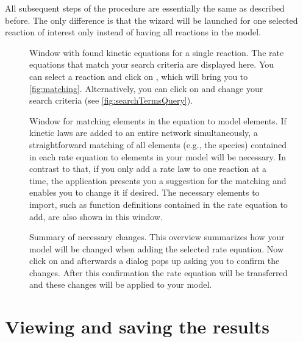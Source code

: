 All subsequent steps of the procedure are essentially the same as described before.
The only difference is that the \SABIO wizard will be launched for one selected reaction of interest only instead of having all reactions in the model.
\begin{figure}[t!]
\caption[Window with found kinetic equations for a single reaction]{Window with found kinetic equations for a single reaction.
The rate equations that match your search criteria are displayed here.
You can select a reaction and click on , which will bring you to \vref{fig:matching}.
Alternatively, you can click on  and change your search criteria (see \vref{fig:searchTermsQuery}).
\label{fig:foundEquationsManual}}
\end{figure}
\begin{figure}
\caption[Window for matching elements in the equation to model elements]{Window for matching elements in the equation to model elements.
If kinetic laws are added to an entire network simultaneously, a straightforward matching of all elements (e.g., the species) contained in each rate equation to \SBML elements in your model will be necessary. 
In contrast to that, if you only add a rate law to one reaction at a time, the application presents you a suggestion for the matching and enables you to change it if desired. 
The necessary elements to import, such as function definitions contained in the rate equation to add, are also shown in this window.}
\label{fig:matching}
\end{figure}
\begin{figure}
\caption[Summary of necessary changes]{Summary of necessary changes.
This overview summarizes how your model will be changed when adding the selected rate equation.
Now click on  and afterwards a dialog pops up asking you to confirm the changes.
After this confirmation the rate equation will be transferred and these changes will be applied to your model.}
\label{fig:changesManual}
\end{figure}


\section{Viewing and saving the results}

